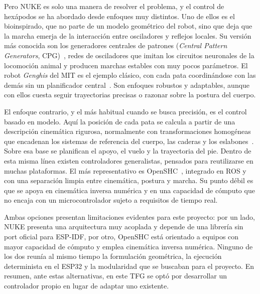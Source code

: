 Pero NUKE es solo una manera de resolver el problema, y el control de hexápodos se
ha abordado desde enfoques muy distintos. Uno de ellos es el bioinspirado, que no
parte de un modelo geométrico del robot, sino que deja que la marcha emerja de la
interacción entre osciladores y reflejos locales. Su versión más conocida son los
generadores centrales de patrones (\textit{Central Pattern Generators}, CPG)~\cite{ijspeert2008cpg},
redes de osciladores que imitan los circuitos neuronales de la locomoción animal y
producen marchas estables con muy pocos parámetros. El robot \textit{Genghis} del
MIT es el ejemplo clásico, con cada pata coordinándose con las demás sin un
planificador central~\cite{brooks1989robot}. Son enfoques robustos y adaptables,
aunque con ellos cuesta seguir trayectorias precisas o razonar sobre la postura
del cuerpo.

El enfoque contrario, y el más habitual cuando se busca precisión, es el control
basado en modelo. Aquí la posición de cada pata se calcula a partir de una
descripción cinemática rigurosa, normalmente con transformaciones homogéneas que
encadenan los sistemas de referencia del cuerpo, las caderas y los
eslabones~\cite{craig2018robotics}. Sobre esa base se planifican el apoyo, el vuelo
y la trayectoria del pie. Dentro de esta misma línea existen
controladores generalistas, pensados para reutilizarse en muchas plataformas. El
más representativo es OpenSHC~\cite{tam2020openshc}, integrado en ROS y con una
separación limpia entre cinemática, postura y marcha. Su punto débil es que se
apoya en cinemática inversa numérica y en una capacidad de cómputo que no encaja
con un microcontrolador sujeto a requisitos de tiempo real.

Ambas opciones presentan limitaciones evidentes para este proyecto: por un lado, NUKE
presenta una arquitectura muy acoplada y depende de una librería sin port oficial para
ESP-IDF, por otro, OpenSHC está orientado a equipos con mayor capacidad de cómputo y
emplea cinemática inversa numérica. Ninguno de los dos reunía al mismo tiempo la formulación geométrica, la
ejecución determinista en el ESP32 y la modularidad que se buscaban para el proyecto. En resumen, ante estas alternativas, en este TFG se optó por desarrollar un controlador propio
en lugar de adaptar uno existente.
